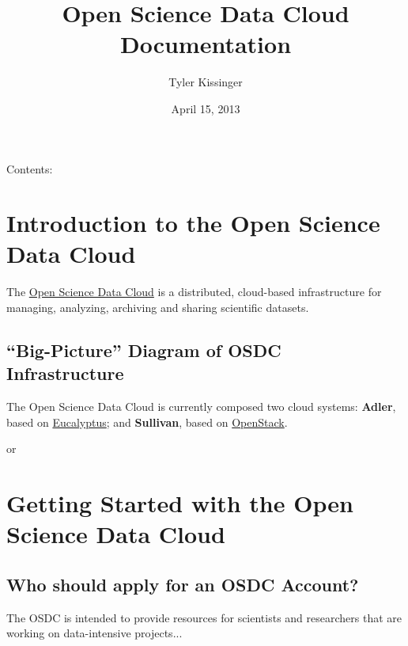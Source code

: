 \documentclass[letterpaper,10pt,english]{sphinxmanual}
\title{Open Science Data Cloud Documentation}
\date{April 15, 2013}
\author{Tyler Kissinger}
\begin{document}
\maketitle
\tableofcontents
{}\label{index::doc}


Contents:


\chapter{Introduction to the Open Science Data Cloud}
\label{intro::doc}\label{intro:introduction-to-the-open-science-data-cloud}\label{intro:welcome-to-open-science-data-cloud-s-documentation}
The \href{https://opensciencedatacloud.org}{Open Science Data Cloud} is a distributed, cloud-based infrastructure for managing, analyzing, archiving and sharing scientific datasets.


\section{``Big-Picture'' Diagram of OSDC Infrastructure}
\label{intro:big-picture-diagram-of-osdc-infrastructure}
The Open Science Data Cloud is currently composed two cloud systems: \textbf{Adler}, based on \href{http://www.eucalyptus.com/eucalyptus-cloud/iaas}{Eucalyptus}; and \textbf{Sullivan}, based on \href{http://www.openstack.org/}{OpenStack}.



 or 




\chapter{Getting Started with the Open Science Data Cloud}
\label{gettingstarted::doc}\label{gettingstarted:getting-started-with-the-open-science-data-cloud}

\section{Who should apply for an OSDC Account?}
\label{gettingstarted:who-should-apply-for-an-osdc-account}
The OSDC is intended to provide resources for scientists and researchers that are working on data-intensive projects...
\end{document}
